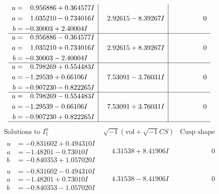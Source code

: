 \documentclass[1p]{elsarticle_modified}
\theoremstyle{definition}
\newcommand{\I}{\sqrt{-1}}
\begin{document}
$$\begin{array}{c|c|c}
\begin{aligned}
u &= \phantom{-}0.956886 + 0.364577 I \\
a &= \phantom{-}1.035210 - 0.734016 I \\
b &= -0.30003 + 2.40004 I\end{aligned}
 & \phantom{-}2.92615 - 8.39267 I & \phantom{-0.000000 } 0 \\ \hline\begin{aligned}
u &= \phantom{-}0.956886 - 0.364577 I \\
a &= \phantom{-}1.035210 + 0.734016 I \\
b &= -0.30003 - 2.40004 I\end{aligned}
 & \phantom{-}2.92615 + 8.39267 I & \phantom{-0.000000 } 0 \\ \hline\begin{aligned}
u &= \phantom{-}0.798269 + 0.554483 I \\
a &= -1.29539 + 0.66106 I \\
b &= -0.907230 - 0.822265 I\end{aligned}
 & \phantom{-}7.53091 - 3.76031 I & \phantom{-0.000000 } 0 \\ \hline\begin{aligned}
u &= \phantom{-}0.798269 - 0.554483 I \\
a &= -1.29539 - 0.66106 I \\
b &= -0.907230 + 0.822265 I\end{aligned}
 & \phantom{-}7.53091 + 3.76031 I & \phantom{-0.000000 } 0\\
 \hline 
 \end{array}$$\newpage$$\begin{array}{c|c|c}  
\text{Solutions to }I^u_{1}& \I (\text{vol} + \sqrt{-1}CS) & \text{Cusp shape}\\
 \hline 
\begin{aligned}
u &= -0.831602 + 0.494310 I \\
a &= -1.48201 - 0.73010 I \\
b &= -0.840353 + 1.057020 I\end{aligned}
 & \phantom{-}4.31538 + 8.41906 I & \phantom{-0.000000 } 0 \\ \hline\begin{aligned}
u &= -0.831602 - 0.494310 I \\
a &= -1.48201 + 0.73010 I \\
b &= -0.840353 - 1.057020 I\end{aligned}
 & \phantom{-}4.31538 - 8.41906 I & \phantom{-0.000000 } 0 \\ \hline\begin{aligned}

\end{aligned}
\end{array}$$
\end{document}
